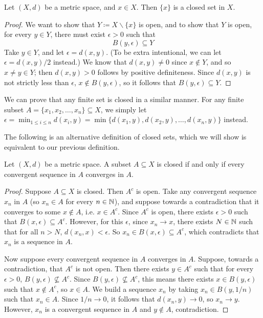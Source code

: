 \begin{prop}
  Let $(X, d)$ be a metric space, and $x \in X$. Then $\{x\}$ is a closed set in $X$.
\end{prop}
\begin{proof}
  We want to show that $Y \coloneqq X \backslash \{x\}$ is open, and to show that $Y$ is open, for every $y \in Y$, there must exist $\epsilon > 0$ such that
  \[
    B(y, \epsilon) \subseteq Y
  \]
  Take $y \in Y$, and let $\epsilon = d(x, y)$. (To be extra intentional, we can let $\epsilon = d(x, y) / 2$ instead.) We know that $d(x, y) \neq 0$ since $x \notin Y$, and so $x \neq y \in Y$; then $d(x, y) > 0$ follows by positive definiteness. Since $d(x, y)$ is not strictly less than $\epsilon$, $x \notin B(y, \epsilon)$, so it follows that $B(y, \epsilon) \subseteq Y$. 
\end{proof}
We can prove that any finite set is closed in a similar manner. For any finite subset $A = \{x_1, x_2, \ldots, x_n\} \subseteq X$, we simply let $\epsilon = \min_{1 \leq i \leq n} d(x_i, y) = \min\{d(x_1, y), d(x_2, y), \ldots, d(x_n, y)\}$ instead.

The following is an alternative definition of closed sets, which we will show is equivalent to our previous definition.
\begin{prop}[PSET 2, Q2]
  Let $(X, d)$ be a metric space. A subset $A \subseteq X$ is closed if and only if every convergent sequence in $A$ converges in $A$.
\end{prop}
\begin{proof}
  Suppose $A \subseteq X$ is closed. Then $A ^ c$ is open. Take any convergent sequence $x_n$ in $A$ (so $x_n \in A$ for every $n \in \mathbb{N}$), and suppose towards a contradiction that it converges to some $x \notin A$, i.e. $x \in A ^ c$. Since $A ^ c$ is open, there exists $\epsilon > 0$ such that $B(x, \epsilon) \subseteq A ^ c$. However, for this $\epsilon$, since $x_n \to x$, there exists $N \in \mathbb{N}$ such that for all $n > N$, $d(x_n, x) < \epsilon$. So $x_n \in B(x, \epsilon) \subseteq A ^ c$, which contradicts that $x_n$ is a sequence in $A$.

  Now suppose every convergent sequence in $A$ converges in $A$. Suppose, towards a contradiction, that $A ^ c$ is not open. Then there exists $y \in A ^ c$ such that for every $\epsilon > 0$, $B(y, \epsilon) \not\subseteq A ^ c$. Since $B(y, \epsilon) \not\subseteq A ^ c$, this means there exists $x \in B(y, \epsilon)$ such that $x \notin A ^ c$, so $x \in A$. We build a sequence $x_n$ by taking $x_n \in B(y, 1 / n)$ such that $x_n \in A$. Since $1 / n \to 0$, it follows that $d(x_n, y) \to 0$, so $x_n \to y$. However, $x_n$ is a convergent sequence in $A$ and $y \notin A$, contradiction.
\end{proof}

